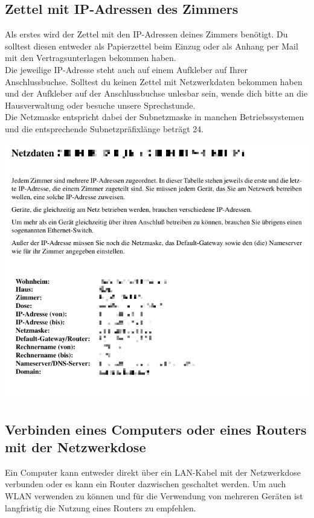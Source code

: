 \documentclass[a4paper,12pt]{scrartcl}
\begin{document}
\subsection{Zettel mit IP-Adressen des Zimmers}
\begin{minipage}{0.6\textwidth}
Als erstes wird der Zettel mit den IP-Adressen deines Zimmers benötigt.
Du solltest diesen entweder als Papierzettel beim Einzug oder als Anhang per Mail mit den Vertragsunterlagen bekommen haben. \\
Die jeweilige IP-Adresse steht auch auf einem Aufkleber auf Ihrer Anschlussbuchse. Solltest du keinen Zettel mit Netzwerkdaten bekommen haben und der Aufkleber auf der Anschlussbuchse unlesbar sein, wende dich bitte an die Hausverwaltung oder besuche unsere Sprechstunde. \\
Die Netzmaske entspricht dabei der Subnetzmaske in manchen Betriebssystemen und die entsprechende Subnetzpräfixlänge beträgt 24.
\end{minipage}
\begin{minipage}{0.4\textwidth}
\includegraphics[width=\linewidth]{Bilder/ip_zettel}
\end{minipage}

\subsection{Verbinden eines Computers oder eines Routers mit der Netzwerkdose}

Ein Computer kann entweder direkt über ein LAN-Kabel mit der Netzwerkdose verbunden oder es kann ein Router dazwischen geschaltet werden.
Um auch WLAN verwenden zu können und für die Verwendung von mehreren Geräten ist langfristig die Nutzung eines Routers zu empfehlen. \\
\end{document}
